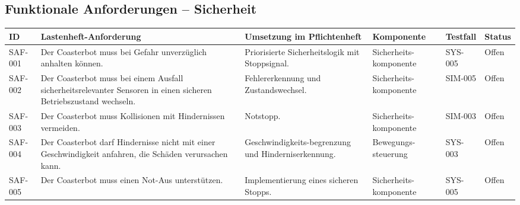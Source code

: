 \subsection{Funktionale Anforderungen --
Sicherheit}\label{funktionale-anforderungen-sicherheit}

\begin{longtable}[]{@{}
  >{\raggedright\arraybackslash}p{}
  >{\raggedright\arraybackslash}p{}
  >{\raggedright\arraybackslash}p{}
  >{\raggedright\arraybackslash}p{}
  >{\raggedleft\arraybackslash}p{}
  >{\raggedright\arraybackslash}p{}@{}}
\toprule\noalign{}
\begin{minipage}[b]{\linewidth}\raggedright
ID
\end{minipage} & \begin{minipage}[b]{\linewidth}\raggedright
Lastenheft-Anforderung
\end{minipage} & \begin{minipage}[b]{\linewidth}\raggedright
Umsetzung im Pflichtenheft
\end{minipage} & \begin{minipage}[b]{\linewidth}\raggedright
Komponente
\end{minipage} & \begin{minipage}[b]{\linewidth}\raggedleft
Testfall
\end{minipage} & \begin{minipage}[b]{\linewidth}\raggedright
Status
\end{minipage} \\
\midrule\noalign{}
\endhead
\bottomrule\noalign{}
\endlastfoot
SAF-001 & Der Coasterbot muss bei Gefahr unverzüglich anhalten können. &
Priorisierte Sicherheitslogik mit Stoppsignal. & Sicherheits-komponente
& SYS-005 & Offen \\
SAF-002 & Der Coasterbot muss bei einem Ausfall sicherheitsrelevanter
Sensoren in einen sicheren Betriebszustand wechseln. & Fehlererkennung
und Zustandswechsel. & Sicherheits-komponente & SIM-005 & Offen \\
SAF-003 & Der Coasterbot muss Kollisionen mit Hindernissen vermeiden. &
Notstopp. & Sicherheits-komponente & SIM-003 & Offen \\
SAF-004 & Der Coasterbot darf Hindernisse nicht mit einer
Geschwindigkeit anfahren, die Schäden verursachen kann. &
Geschwindigkeits-begrenzung und Hinderniserkennung. &
Bewegungs-steuerung & SYS-003 & Offen \\
SAF-005 & Der Coasterbot muss einen Not-Aus unterstützen. &
Implementierung eines sicheren Stopps. & Sicherheits-komponente &
SYS-005 & Offen \\
\end{longtable}

